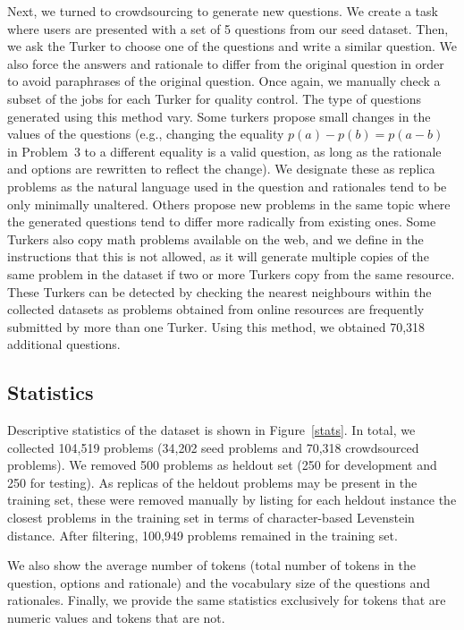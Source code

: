 Next, we turned to crowdsourcing to generate new questions. We create a task where users are presented with a set of 5 questions from our seed dataset. Then, we ask the Turker to choose one of the questions and write a similar question. We also force the answers and rationale to differ from the original question in order to avoid paraphrases of the original question. Once again, we manually check a subset of the jobs for each Turker for quality control. The type of questions generated using this method vary. Some turkers propose small changes in the values of the questions (e.g., changing the equality $p(a)-p(b)=p(a-b)$ in Problem~3 to a different equality is a valid question, as long as the rationale and options are rewritten to reflect the change). We designate these as replica problems as the natural language used in the question and rationales tend to be only minimally unaltered. Others propose new problems in the same topic where the generated questions tend to differ more radically from existing ones. Some Turkers also copy math problems available on the web, and we define in the instructions that this is not allowed, as it will generate multiple copies of the same problem in the dataset if two or more Turkers copy from the same resource. These Turkers can be detected by checking the nearest neighbours within the collected datasets as problems obtained from online resources are frequently submitted by more than one Turker. Using this method, we obtained 70,318 additional questions.

\subsection{Statistics}

Descriptive statistics of the dataset is shown in Figure~\ref{stats}. In total, we collected 104,519 problems (34,202 seed problems and 70,318 crowdsourced problems). We removed 500 problems as heldout set (250 for development and 250 for testing). As replicas of the heldout problems may be present in the training set, these were removed manually by listing for each heldout instance the closest problems in the training set in terms of character-based Levenstein distance. After filtering, 100,949 problems remained in the training set.

We also show the average number of tokens (total number of tokens in the question, options and rationale) and the vocabulary size of the questions and rationales. Finally, we provide the same statistics exclusively for tokens that are numeric values and tokens that are not.

